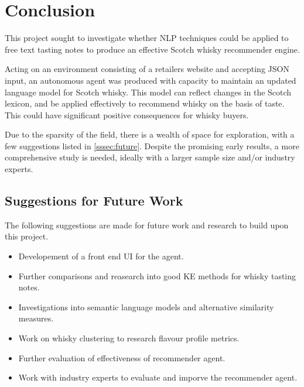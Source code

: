 \section{Conclusion}\label{sec:conc}
This project sought to investigate whether NLP techniques could be applied to free text tasting notes 
to produce an effective Scotch whisky recommender engine.

Acting on an environment consisting of a retailers website and accepting JSON input, an autonomous
agent was produced with capacity to maintain an updated language model for Scotch whisky. This model
can reflect changes in the Scotch lexicon, and be applied effectively to recommend whisky on the basis of
taste. This could have significant positive consequences for whisky buyers.

Due to the sparsity of the field, there is a wealth of space for exploration, with a few suggestions listed
in \autoref{sssec:future}.  Despite the promising early results, a more comprehensive study is needed, ideally
with a larger sample size and/or industry experts.

\subsection{Suggestions for Future Work}\label{sssec:future}

The following suggestions are made for future work and research to build upon this project.

\begin{itemize}
    \item Developement of a front end UI for the agent.
    \item Further comparisons and reasearch into good KE methods for whisky tasting notes.
    \item Investigations into semantic language models and alternative similarity measures.
    \item Work on whisky clustering to research flavour profile metrics.
    \item Further evaluation of effectiveness of recommender agent.
    \item Work with industry experts to evaluate and imporve the recommender agent.
\end{itemize}